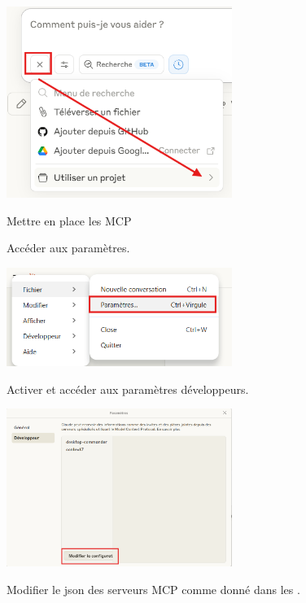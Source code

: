 \begin{Aide}
\begin{tcbenumerate}[2]
        \vspace{-0.3cm}\begin{center}\includegraphics[width=0.55\textwidth]{images/Claude_setup_projects/use-setup.png}\end{center}
    \end{tcbenumerate}

    \begin{bfbox}{Mettre en place les MCP}
    \begin{tcbenumerate}[2]
        \tcbitem Accéder aux paramètres. 
        
        \vspace{-0.3cm}\begin{center}\includegraphics[width=0.55\textwidth]{images/Claude-setup-mcp/1.png}\end{center}
        \tcbitem Activer et accéder aux paramètres développeurs. 
        
        \vspace{-0.3cm}\begin{center}\includegraphics[width=0.55\textwidth]{images/Claude-setup-mcp/2.png}\end{center}
        \tcbitem Modifier le json des serveurs MCP comme donné dans les .


\end{tcbenumerate}
\end{bfbox}
\end{Aide}
